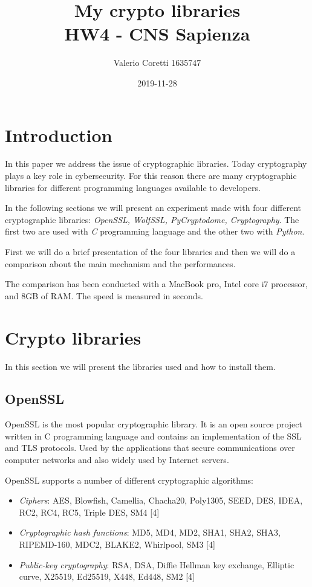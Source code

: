 \documentclass[11pt]{article}
\title{{\bf My crypto libraries} \\ \bigskip \large HW4 - CNS Sapienza}
\date{2019-11-28}
\author{Valerio Coretti 1635747}
\begin{document}
\maketitle

\section{Introduction}
In this paper we address the issue of cryptographic libraries. Today cryptography plays a key role in cybersecurity. For this reason there are many cryptographic libraries for different programming languages available to developers.

In the following sections we will present an experiment made with four different cryptographic libraries: {\em OpenSSL, WolfSSL, PyCryptodome, Cryptography}. The first two are used with {\em C} programming language and the other two with {\em Python}.

First we will do a brief presentation of the four libraries and then we will do a comparison about the main mechanism and the performances.

The comparison has been conducted with a MacBook pro, Intel core i7 processor, and 8GB of RAM. The speed is measured in seconds.

\section{Crypto libraries}
In this section we will present the libraries used and how to install them.

\subsection{OpenSSL}
OpenSSL is the most popular cryptographic library. It is an open source project written in C programming language and contains an implementation of the SSL and TLS protocols. Used by the applications that secure communications over computer networks and also widely used by Internet servers.

OpenSSL supports a number of different cryptographic algorithms:
\begin{itemize}
  \item {\em Ciphers}: AES, Blowfish, Camellia, Chacha20, Poly1305, SEED, DES, IDEA, RC2, RC4, RC5, Triple DES, SM4 [4]
  \item {\em Cryptographic hash functions}: MD5, MD4, MD2, SHA1, SHA2, SHA3, RIPEMD-160, MDC2, BLAKE2, Whirlpool, SM3 [4]
  \item {\em Public-key cryptography}: RSA, DSA, Diffie Hellman key exchange, Elliptic curve, X25519, Ed25519, X448, Ed448, SM2  [4]
\end{itemize}
\end{document}
